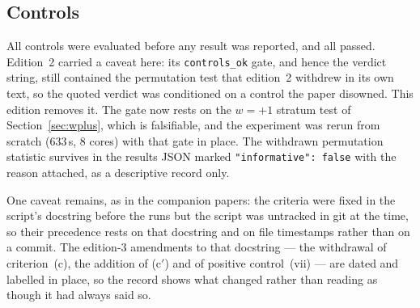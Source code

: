 \documentclass[11pt,a4paper]{article}
\theoremstyle{definition}
\begin{document}
\subsection{Controls}
All controls were evaluated before any result was reported, and all passed. Edition~2 carried a caveat here: its \texttt{controls\_ok} gate, and hence the verdict string, still contained the permutation test that edition~2 withdrew in its own text, so the quoted verdict was conditioned on a control the paper disowned. This edition removes it. The gate now rests on the $w=+1$ stratum test of Section~\ref{sec:wplus}, which is falsifiable, and the experiment was rerun from scratch (633\,s, 8 cores) with that gate in place. The withdrawn permutation statistic survives in the results JSON marked \texttt{"informative": false} with the reason attached, as a descriptive record only.

One caveat remains, as in the companion papers: the criteria were fixed in the script's docstring before the runs but the script was untracked in git at the time, so their precedence rests on that docstring and on file timestamps rather than on a commit. The edition-3 amendments to that docstring --- the withdrawal of criterion~(c), the addition of (c$'$) and of positive control~(vii) --- are dated and labelled in place, so the record shows what changed rather than reading as though it had always said so.
\end{document}
